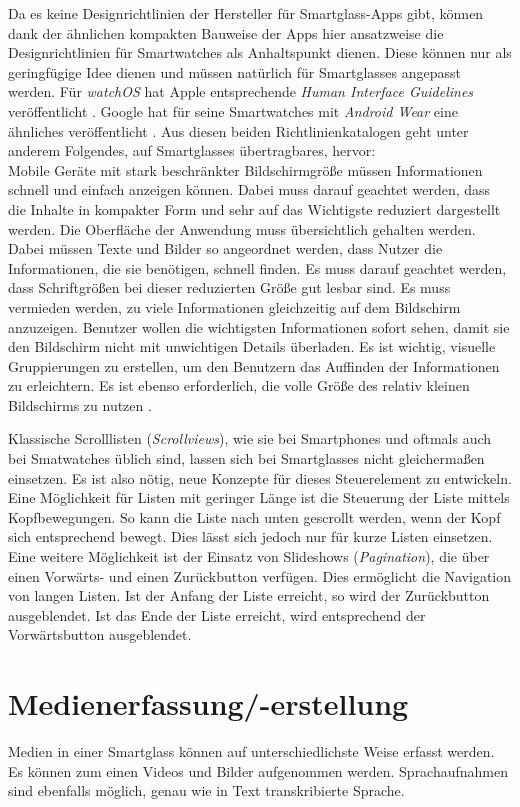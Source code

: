 Da es keine Designrichtlinien der Hersteller für Smartglass-Apps gibt, können dank der ähnlichen kompakten Bauweise der Apps hier ansatzweise die Designrichtlinien für Smartwatches als Anhaltspunkt dienen. Diese können nur als geringfügige Idee dienen und müssen natürlich für Smartglasses angepasst werden.
Für \emph{watchOS} hat Apple entsprechende \emph{Human Interface Guidelines} veröffentlicht \cite{Apple2018c}. Google hat für seine Smartwatches mit \emph{Android Wear} eine ähnliches veröffentlicht \cite{Google2018}. Aus diesen beiden Richtlinienkatalogen geht unter anderem Folgendes, auf Smartglasses übertragbares, hervor:
\\
Mobile Geräte mit stark beschränkter Bildschirmgröße  müssen Informationen schnell und einfach anzeigen können. Dabei muss darauf geachtet werden, dass die Inhalte in kompakter Form und sehr auf das Wichtigste reduziert dargestellt werden. Die Oberfläche der Anwendung muss übersichtlich gehalten werden. Dabei müssen Texte und Bilder so angeordnet werden, dass Nutzer die Informationen, die sie benötigen, schnell finden. Es muss darauf geachtet werden, dass Schriftgrößen bei dieser reduzierten Größe gut lesbar sind. Es muss vermieden werden, zu viele Informationen gleichzeitig auf dem Bildschirm anzuzeigen. Benutzer wollen die wichtigsten Informationen sofort sehen, damit sie den Bildschirm nicht mit unwichtigen Details überladen. Es ist wichtig, visuelle Gruppierungen zu erstellen, um den Benutzern das Auffinden der Informationen zu erleichtern. Es ist ebenso erforderlich, die volle Größe des relativ kleinen Bildschirms zu nutzen \cite{Apple2018c, Google2018}.

Klassische Scrolllisten (\emph{Scrollviews}), wie sie bei Smartphones und oftmals auch bei Smatwatches üblich sind, lassen sich bei Smartglasses nicht gleichermaßen einsetzen. Es ist also nötig, neue Konzepte für dieses Steuerelement zu entwickeln. Eine Möglichkeit für Listen mit geringer Länge ist die Steuerung der Liste mittels Kopfbewegungen. So kann die Liste nach unten gescrollt werden, wenn der Kopf sich entsprechend bewegt. Dies lässt sich jedoch nur für kurze Listen einsetzen. Eine weitere Möglichkeit ist der Einsatz von Slideshows (\emph{Pagination}), die über einen Vorwärts- und einen Zurückbutton verfügen. Dies ermöglicht die Navigation von langen Listen. Ist der Anfang der Liste erreicht, so wird der Zurückbutton ausgeblendet. Ist das Ende der Liste erreicht, wird entsprechend der Vorwärtsbutton ausgeblendet.
%
%
%
%
%
%
\section{Medienerfassung/-erstellung}
\label{sec:Medienerfassung_-erstellung}
Medien in einer Smartglass können auf unterschiedlichste Weise erfasst werden. Es können zum einen Videos und Bilder aufgenommen werden. Sprachaufnahmen sind ebenfalls möglich, genau wie in Text transkribierte Sprache.

